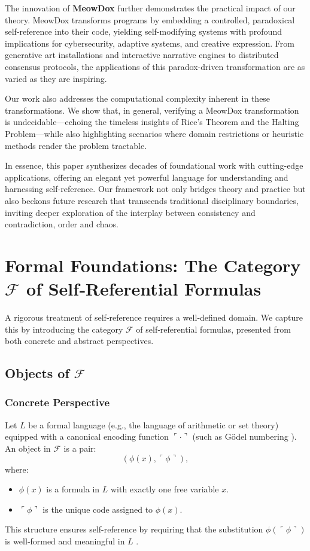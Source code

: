 \documentclass[12pt]{amsart}
\theoremstyle{plain}
\theoremstyle{definition}
\theoremstyle{remark}
\begin{document}
The innovation of \textbf{MeowDox} further demonstrates the practical impact of our theory. MeowDox transforms programs by embedding a controlled, paradoxical self-reference into their code, yielding self-modifying systems with profound implications for cybersecurity, adaptive systems, and creative expression. From generative art installations and interactive narrative engines to distributed consensus protocols, the applications of this paradox-driven transformation are as varied as they are inspiring.

Our work also addresses the computational complexity inherent in these transformations. We show that, in general, verifying a MeowDox transformation is undecidable---echoing the timeless insights of Rice’s Theorem and the Halting Problem---while also highlighting scenarios where domain restrictions or heuristic methods render the problem tractable.

In essence, this paper synthesizes decades of foundational work with cutting-edge applications, offering an elegant yet powerful language for understanding and harnessing self-reference. Our framework not only bridges theory and practice but also beckons future research that transcends traditional disciplinary boundaries, inviting deeper exploration of the interplay between consistency and contradiction, order and chaos.

\section{Formal Foundations: The Category $\mathcal{F}$ of Self‐Referential Formulas}

A rigorous treatment of self‐reference requires a well‐defined domain. We capture this by introducing the category $\mathcal{F}$ of self‐referential formulas, presented from both concrete and abstract perspectives.

\subsection{Objects of $\mathcal{F}$}

\subsubsection{Concrete Perspective}
Let $L$ be a formal language (e.g., the language of arithmetic or set theory) equipped with a canonical encoding function $\ulcorner \cdot \urcorner$ (such as Gödel numbering \cite{Gödel1931}). An object in $\mathcal{F}$ is a pair:
\[
(\phi(x), \ulcorner \phi \urcorner),
\]
where:
\begin{itemize}[leftmargin=*, label={\textbullet}]
    \item $\phi(x)$ is a formula in $L$ with exactly one free variable $x$.
    \item $\ulcorner \phi \urcorner$ is the unique code assigned to $\phi(x)$.
\end{itemize}
This structure ensures self-reference by requiring that the substitution $\phi(\ulcorner \phi \urcorner)$ is well‐formed and meaningful in $L$ \cite{Russell1908}.
\end{document}
